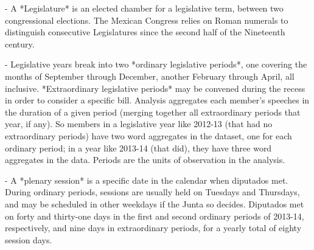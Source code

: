 \documentclass[letter,12pt]{article}
\begin{document}
- A *Legislature* is an elected chamber for a legislative term, between two congressional elections. The Mexican Congress relies on Roman numerals to distinguish consecutive Legislatures since the second half of the Nineteenth century.

- Legislative years break into two *ordinary legislative periods*, one covering the months of September through December, another February through April, all inclusive. *Extraordinary legislative periods* may be convened during the recess in order to consider a specific bill. Analysis aggregates each member's speeches in the duration of a given period (merging together all extraordinary periods that year, if any). So members in a legislative year like 2012-13 (that had no extraordinary periods) have two word aggregates in the dataset, one for each ordinary period; in a year like 2013-14 (that did), they have three word aggregates in the data. Periods are the units of observation in the analysis. 

- A *plenary session* is a specific date in the calendar when diputados met. During ordinary periods, sessions are usually held on Tuesdays and Thursdays, and may be scheduled in other weekdays if the Junta so decides. Diputados met on forty and thirty-one days in the first and second ordinary periods of 2013-14, respectively, and nine days in extraordinary periods, for a yearly total of eighty session days.



                                                                                                                                  
\end{document}
